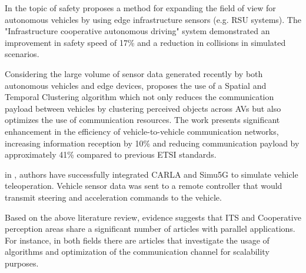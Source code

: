 In the topic of safety \cite{safety} proposes a method for expanding the field of view for autonomous vehicles by using edge infrastructure sensors (e.g. RSU systems). The "Infrastructure cooperative autonomous driving" system demonstrated an improvement in safety speed of 17\% and a reduction in collisions in simulated scenarios.

Considering the large volume of sensor data generated recently by both autonomous vehicles and edge devices, \cite{10470399} proposes the use of a Spatial and Temporal Clustering algorithm which not only reduces the communication payload between vehicles by clustering perceived objects across AVs but also optimizes the use of communication resources. The work presents significant enhancement in the efficiency of vehicle-to-vehicle communication networks, increasing information reception by 10\% and reducing communication payload by approximately 41\% compared to previous ETSI standards.

in \cite{cislaghi2023simulation}, authors have successfully integrated CARLA and Simu5G to simulate vehicle teleoperation. Vehicle sensor data was sent to a remote controller that would transmit steering and acceleration commands to the vehicle.

Based on the above literature review, evidence suggests that ITS and Cooperative perception areas share a significant number of articles with parallel applications. For instance, in both fields there are articles that investigate the usage of algorithms and optimization of the communication channel for scalability purposes.


